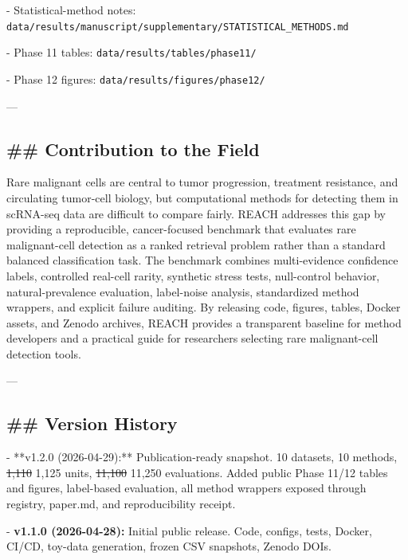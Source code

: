 \documentclass[11pt]{article}
\newcommand{\added}[1]{{\color{trackred}#1}}
\newcommand{\deleted}[1]{{\color{trackred}\sout{#1}}}
\begin{document}
- Statistical-method notes: \texttt{data/results/manuscript/supplementary/STATISTICAL\_METHODS.md}

- Phase 11 tables: \texttt{data/results/tables/phase11/}

- Phase 12 figures: \texttt{data/results/figures/phase12/}

---

\subsection*{\#\# Contribution to the Field}
Rare malignant cells are central to tumor progression, treatment resistance, and circulating tumor-cell biology, but computational methods for detecting them in scRNA-seq data are difficult to compare fairly. REACH addresses this gap by providing a reproducible, cancer-focused benchmark that evaluates rare malignant-cell detection as a ranked retrieval problem rather than a standard balanced classification task. The benchmark combines multi-evidence confidence labels, controlled real-cell rarity, synthetic stress tests, null-control behavior, natural-prevalence evaluation, label-noise analysis, standardized method wrappers, and explicit failure auditing. By releasing code, figures, tables, Docker assets, and Zenodo archives, REACH provides a transparent baseline for method developers and a practical guide for researchers selecting rare malignant-cell detection tools.

---

\subsection*{\#\# Version History}
- **v1.2.0 (2026-04-29):** Publication-ready snapshot. 10 datasets, 10 methods, \deleted{1,110} \added{1,125} units, \deleted{11,100} \added{11,250} evaluations. Added public Phase 11/12 tables and figures, label-based evaluation, all method wrappers exposed through registry, paper.md, and reproducibility receipt.

- \textbf{v1.1.0 (2026-04-28):} Initial public release. Code, configs, tests, Docker, CI/CD, toy-data generation, frozen CSV snapshots, Zenodo DOIs.
\end{document}

